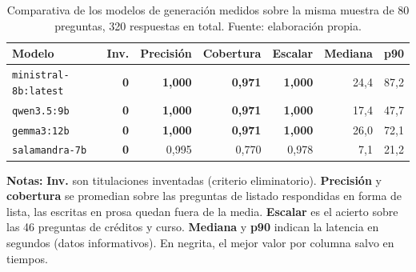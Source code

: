 \begin{table}[htbp]
  \centering
  \small
  \caption[Comparativa de modelos de generación]{%
    Comparativa de los modelos de generación medidos sobre
      la misma muestra de 80 preguntas, 320 respuestas en total. Fuente:
      elaboración propia.}
  \label{tab:comparativa_generacion}
  \begin{tabular}{@{}lrrrrrr@{}}
    \toprule
    \textbf{Modelo}                    & \textbf{Inv.} & \textbf{Precisión}
                                       & \textbf{Cobertura}
                                       & \textbf{Escalar}
                                       & \textbf{Mediana} & \textbf{p90}   \\
    \midrule
    \texttt{ministral-8b:latest}       & \textbf{0}    & \textbf{1,000}
                                       & \textbf{0,971}
                                       & \textbf{1,000}
                                       & 24,4
                                       & 87,2   \\
    \texttt{qwen3.5:9b}                & \textbf{0}    & \textbf{1,000}
                                       & \textbf{0,971}
                                       & \textbf{1,000}
                                       & 17,4
                                       & 47,7   \\
    \texttt{gemma3:12b}                & \textbf{0}    & \textbf{1,000}
                                       & \textbf{0,971}
                                       & \textbf{1,000}
                                       & 26,0
                                       & 72,1   \\
    \midrule
    \texttt{salamandra-7b}             & \textbf{0}    & 0,995
                                       & 0,770
                                       & 0,978
                                       & 7,1
                                       & 21,2   \\
    \bottomrule
  \end{tabular}
  \begin{minipage}{0.95\textwidth}
    \vspace{4pt}
    \tiny
    \textbf{Notas:} \textbf{Inv.} son titulaciones inventadas (criterio eliminatorio).
    \textbf{Precisión} y \textbf{cobertura} se promedian sobre las preguntas de listado respondidas en forma de lista, las escritas en prosa quedan fuera de la media.
    \textbf{Escalar} es el acierto sobre las 46 preguntas de créditos y curso.
    \textbf{Mediana} y \textbf{p90} indican la latencia en segundos (datos informativos).
    En negrita, el mejor valor por columna salvo en tiempos.
  \end{minipage}
\end{table}
